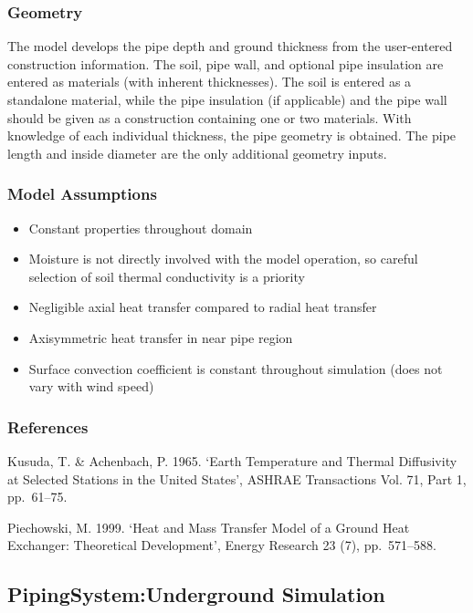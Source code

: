 \subsubsection{Geometry}\label{geometry}

The model develops the pipe depth and ground thickness from the user-entered construction information. The soil, pipe wall, and optional pipe insulation are entered as materials (with inherent thicknesses). The soil is entered as a standalone material, while the pipe insulation (if applicable) and the pipe wall should be given as a construction containing one or two materials. With knowledge of each individual thickness, the pipe geometry is obtained. The pipe length and inside diameter are the only additional geometry inputs.

\subsubsection{Model Assumptions}\label{model-assumptions-000}

\begin{itemize}
\item
  Constant properties throughout domain
\item
  Moisture is not directly involved with the model operation, so careful selection of soil thermal conductivity is a priority
\item
  Negligible axial heat transfer compared to radial heat transfer
\item
  Axisymmetric heat transfer in near pipe region
\item
  Surface convection coefficient is constant throughout simulation (does not vary with wind speed)
\end{itemize}

\subsubsection{References}\label{references-1-015}

Kusuda, T. \& Achenbach, P. 1965. `Earth Temperature and Thermal Diffusivity at Selected Stations in the United States', ASHRAE Transactions Vol. 71, Part 1, pp.~61--75.

Piechowski, M. 1999. `Heat and Mass Transfer Model of a Ground Heat Exchanger: Theoretical Development', Energy Research 23 (7), pp.~571--588.

\subsection{PipingSystem:Underground Simulation}\label{pipingsystemunderground-simulation}

